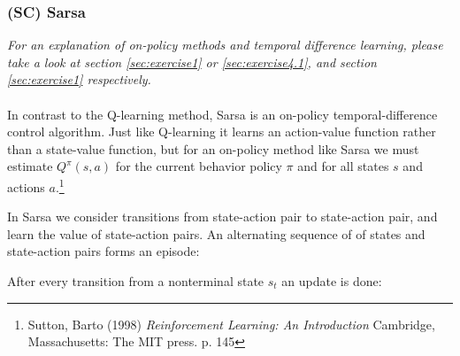 \documentclass{article}
\begin{document}
\subsubsection{(SC) Sarsa}\label{sec:exercise4.3}
\textit{For an explanation of on-policy methods and temporal difference learning, please take a look at section \ref{sec:exercise1} or \ref{sec:exercise4.1}, and section \ref{sec:exercise1} respectively.}
\\ \\
In contrast to the Q-learning method, Sarsa is an on-policy temporal-difference control algorithm. Just like Q-learning it learns an action-value function rather than a state-value function, but for an on-policy method like Sarsa we must estimate $Q^\pi (s,a)$ for the current behavior policy $\pi$ and for all states $s$ and actions $a$.\footnote{Sutton, Barto (1998) \textit{Reinforcement Learning: An Introduction} Cambridge, Massachusetts: The MIT press. p. 145}

In Sarsa we consider transitions from state-action pair to state-action pair, and learn the value of state-action pairs. An alternating sequence of of states and state-action pairs forms an episode:

\begin{center}
\end{center}

After every transition from a nonterminal state $s_t$ an update is done:
\end{document}
